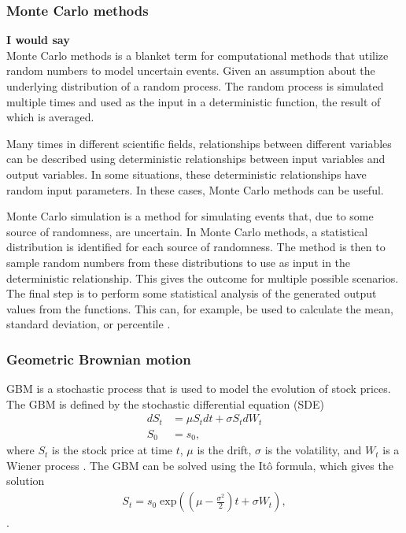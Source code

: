 \subsubsection{Monte Carlo methods} 

\begin{generalinstructions}
    \textbf{I would say}\\
    Monte Carlo methods is a blanket term for computational methods that utilize random numbers to model uncertain events. Given an assumption about the underlying distribution of a random process. The random process is simulated multiple times and used as the input in a deterministic function, the result of which is averaged. 
\end{generalinstructions}

Many times in different scientific fields, relationships between different variables can be described using deterministic relationships between input variables and output variables. In some situations, these deterministic relationships have random input parameters. In these cases, Monte Carlo methods can be useful. 

Monte Carlo simulation is a method for simulating events that, due to some source of randomness, are uncertain. In Monte Carlo methods, a statistical distribution is identified for each source of randomness. The method is then to sample random numbers from these distributions to use as input in the deterministic relationship. This gives the outcome for multiple possible scenarios. The final step is to perform some statistical analysis of the generated output values from the functions. This can, for example, be used to calculate the mean, standard deviation, or percentile .



\subsubsection{Geometric Brownian motion}
\gls{GBM} is a stochastic process that is used to model the evolution of stock prices. The \gls{GBM} is defined by the stochastic differential equation (SDE)
\begin{align*}
    dS_t &= \mu S_t dt + \sigma S_t dW_t \\
    S_0 &= s_0, 
\end{align*}
where $S_t$ is the stock price at time $t$, $\mu$ is the drift, $\sigma$ is the volatility, and $W_t$ is a Wiener process  . The \gls{GBM} can be solved using the Itô formula, which gives the solution
\begin{align*}
    S_t = s_0 \;\mathrm{exp}\left( \left( \mu - \frac{\sigma^2}{2} \right)t + \sigma W_t \right),
\end{align*}
.



